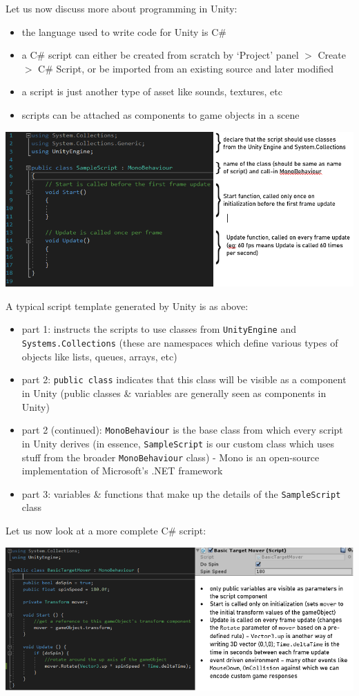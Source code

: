 \documentclass{article}[a4paper,12pt]
\theoremstyle{definition}
\begin{document}
Let us now discuss more about programming in Unity:
\begin{itemize}
	\item the language used to write code for Unity is C\#
	\item a C\# script can either be created from scratch by `Project' panel $>$ Create $>$ C\# Script, or be imported from an existing source and later modified
	\item a script is just another type of asset like sounds, textures, etc
	\item scripts can be attached as components to game objects in a scene
\end{itemize}
\begin{center}\includegraphics[width=\textwidth]{program_basic_structure.png}\end{center}
A typical script template generated by Unity is as above:
\begin{itemize}
	\item part 1: instructs the scripts to use classes from \texttt{UnityEngine} and \texttt{Systems.Collections} (these are namespaces which define various types of objects like lists, queues, arrays, etc)
	\item part 2: \texttt{public class} indicates that this class will be visible as a component in Unity (public classes \& variables are generally seen as components in Unity)
	\item part 2 (continued): \texttt{MonoBehaviour} is the base class from which every script in Unity derives (in essence, \texttt{SampleScript} is our custom class which uses stuff from the broader \texttt{MonoBehaviour} class) - Mono is an open-source implementation of Microsoft's .NET framework
	\item part 3: variables \& functions that make up the details of the \texttt{SampleScript} class
\end{itemize}
\pagebreak
Let us now look at a more complete C\# script:
\begin{center}\includegraphics[width=\textwidth]{basic_target_mover.png}\end{center}
\end{document}
